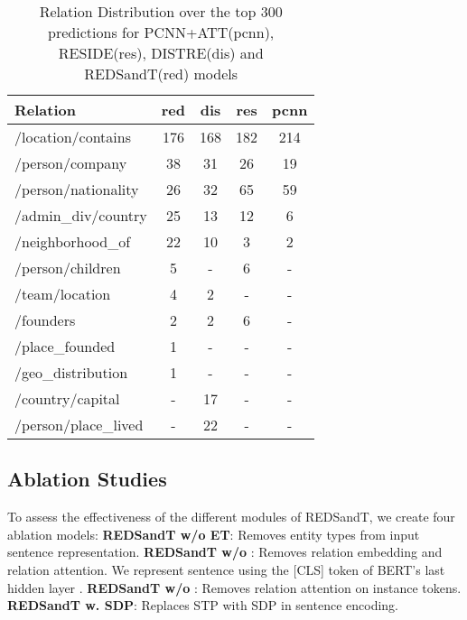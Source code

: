 \documentclass[11pt,a4paper]{article}
\begin{document}
\begin{table}[t]
\begin{tabular}{@{}l*4c@{}} 
\toprule
 Relation  & red & dis & res & pcnn \\
 \midrule
 /location/contains   & 176 & 168 & 182& 214\\
 /person/company      & 38  & 31  & 26 & 19\\
 /person/nationality  & 26  & 32  & 65 & 59\\
 /admin\_div/country  & 25  & 13  & 12 & 6\\
 /neighborhood\_of    & 22  & 10  & 3  & 2\\
 /person/children     & 5   &  -  & 6  & -\\
 /team/location       & 4   & 2   &  - & -\\
 /founders            & 2   &  2  & 6  & -\\
 /place\_founded      & 1   &  -  & -  & -\\
 /geo\_distribution   & 1   &  -  & -  & -\\
 /country/capital     & -   & 17  & -  & -\\
 /person/place\_lived & -   & 22  & -  & -\\
\bottomrule
\end{tabular}
\caption{Relation Distribution over the top 300 predictions for PCNN+ATT(pcnn), RESIDE(res), DISTRE(dis) and REDSandT(red) models}
\label{table:relDistributionTop300}
\vspace{-2mm}
\end{table}

\subsection{Ablation Studies}
\label{sec:ablation_studies}
To assess the effectiveness of the different modules of REDSandT, we create four ablation models:
\newline
\textbf{REDSandT w/o ET}: Removes entity types from input sentence representation.
\newline
\textbf{REDSandT w/o }: Removes relation embedding and relation attention. We represent sentence using the [CLS] token of BERT's last hidden layer  . 
\newline
\textbf{REDSandT w/o }: Removes relation attention on instance tokens.
\newline
\textbf{REDSandT w. SDP}: Replaces STP with SDP \cite{Xu2015} in sentence encoding.
\end{document}
